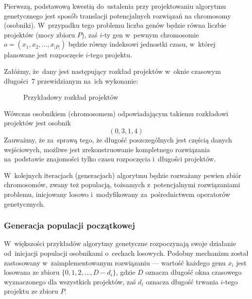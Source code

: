 \documentclass[12pt,a4paper]{article}
\theoremstyle{definition}
\begin{document}
\noindent
Pierwszą, podstawową kwestią do~ustalenia przy projektowaniu algorytmu genetycznego jest sposób translacji potencjalnych rozwiązań na chromosomy (osobniki).
W~przypadku tego problemu liczba genów będzie równa liczbie projektów (mocy zbioru $P$), zaś $i$-ty gen w~pewnym chromosomie $o = (x_1, x_2, \dots, x_{|P|})$ będzie równy indeksowi jednostki czasu, w~której planowane jest rozpoczęcie $i$-tego projektu. \\

\begin{tcolorbox}[title=Przykład --- reprezentacja rozwiązania zadania przez chromosom]
Załóżmy, że~dany jest następujący rozkład projektów w~oknie czasowym długości~7 przewidzianym na~ich wykonanie:

\begin{figure}[H]
	\centering
	\caption{Przykładowy rozkład projektów}
	\label{fig:scheduling1}
\end{figure}

Wówczas osobnikiem (chromosomem) odpowiadającym takiemu rozkładowi projektów jest osobnik
$$ (0, 3, 1, 4) $$
Zauważmy, że za~sprawą tego, że długość poszczególnych jest częścią danych wejściowych, możliwe jest zrekonstruowanie kompletnego rozwiązania na~podstawie znajomości tylko czasu rozpoczęcia i~długości projektów.
\end{tcolorbox}
\vspace{0.5em}
\noindent
W~kolejnych iteracjach (generacjach) algorytmu będzie rozważany pewien zbiór chromosomów, zwany też populacją, tożsamych z~potencjalnymi rozwiązaniami problemu, inicjowany losowo i~modyfikowany za~pośrednictwem operatorów genetycznych.

\subsubsection{Generacja populacji początkowej}
W~większości przykładów algorytmy genetyczne rozpoczynają swoje działanie od~inicjacji populacji osobnikami o~cechach losowych.
Podobny mechanizm został zastosowany w~zaimplementowanym rozwiązaniu --- wartość każdego genu $x_i$ jest losowana ze zbioru $\{0, 1, 2, \dots, D - d_i \}$, gdzie $D$ oznacza długość okna czasowego wyznaczonego dla wszystkich projektów, zaś $d_i$ oznacza długość trwania $i$-tego projektu ze zbioru $P$. \\
\end{document}
